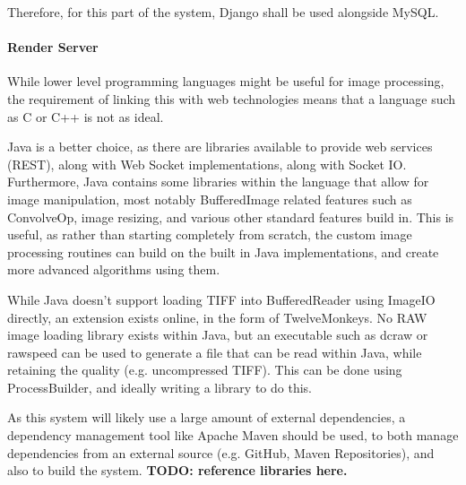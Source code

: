 \documentclass[12pt,a4paper]{article}
\begin{document}
 Therefore, for this part of the system, Django shall be used alongside MySQL.
\paragraph{Render Server}
While lower level programming languages might be useful for image processing,
the requirement of linking this with web technologies means that a language such as C
or C++ is not as ideal.

Java is a better choice, as there are libraries available to provide web services (REST),
along with Web Socket implementations, along with Socket IO. Furthermore, Java contains
some libraries within the language that allow for image manipulation, most notably
BufferedImage related features such as ConvolveOp, image resizing, and various other standard
features build in. This is useful, as rather than starting completely from scratch, the custom
image processing routines can build on the built in Java implementations, and create more advanced
algorithms using them.

While Java doesn't support loading TIFF into BufferedReader using ImageIO directly,
an extension exists online, in the form of TwelveMonkeys. No RAW image loading library
exists within Java, but an executable such as dcraw or rawspeed can be used to generate a file
that can be read within Java, while retaining the quality (e.g. uncompressed TIFF). This can be done
using ProcessBuilder, and ideally writing a library to do this.

As this system will likely use a large amount of external dependencies, a dependency management tool
like Apache Maven should be used, to both manage dependencies from an external source (e.g. GitHub, Maven
Repositories), and also to build the system.
\textbf{TODO: reference libraries here.}
\end{document}
